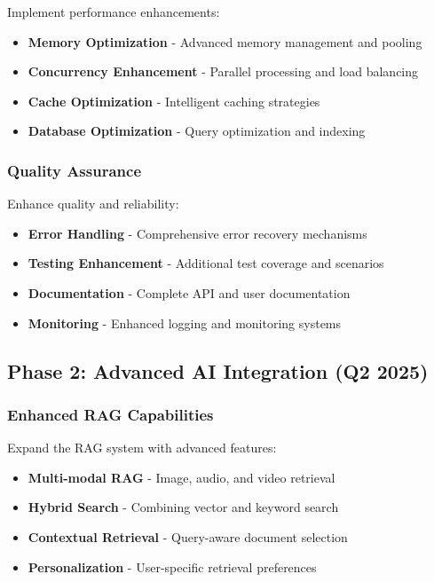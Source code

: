 \documentclass[11pt]{article}
\begin{document}
Implement performance enhancements:

\begin{itemize}
\item \textbf{Memory Optimization} - Advanced memory management and pooling
\item \textbf{Concurrency Enhancement} - Parallel processing and load balancing
\item \textbf{Cache Optimization} - Intelligent caching strategies
\item \textbf{Database Optimization} - Query optimization and indexing
\end{itemize}

\subsubsection{Quality Assurance}

Enhance quality and reliability:

\begin{itemize}
\item \textbf{Error Handling} - Comprehensive error recovery mechanisms
\item \textbf{Testing Enhancement} - Additional test coverage and scenarios
\item \textbf{Documentation} - Complete API and user documentation
\item \textbf{Monitoring} - Enhanced logging and monitoring systems
\end{itemize}

\subsection{Phase 2: Advanced AI Integration (Q2 2025)}

\subsubsection{Enhanced RAG Capabilities}

Expand the RAG system with advanced features:

\begin{itemize}
\item \textbf{Multi-modal RAG} - Image, audio, and video retrieval
\item \textbf{Hybrid Search} - Combining vector and keyword search
\item \textbf{Contextual Retrieval} - Query-aware document selection
\item \textbf{Personalization} - User-specific retrieval preferences
\end{itemize}
\end{document}
